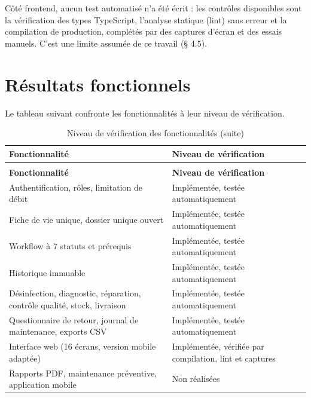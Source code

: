 Côté frontend, aucun test automatisé n'a été écrit : les contrôles disponibles sont la vérification des types TypeScript, l'analyse statique (lint) sans erreur et la compilation de production, complétés par des captures d'écran et des essais manuels. C'est une limite assumée de ce travail (§ 4.5).

\section{Résultats fonctionnels}

Le tableau suivant confronte les fonctionnalités à leur niveau de vérification.


{\small{}\renewcommand{\arraystretch}{1.3}
\begin{longtable}{|>{\raggedright\arraybackslash}p{8.22cm}|>{\raggedright\arraybackslash}p{6.39cm}|}
\caption{Niveau de vérification des fonctionnalités}\\
\hline
\rowcolor{ALbleu} \sffamily\bfseries\color{white} Fonctionnalité & \sffamily\bfseries\color{white} Niveau de vérification \\ \hline
\endfirsthead
\caption[]{Niveau de vérification des fonctionnalités (suite)}\\
\hline
\rowcolor{ALbleu} \sffamily\bfseries\color{white} Fonctionnalité & \sffamily\bfseries\color{white} Niveau de vérification \\ \hline
\endhead
Authentification, rôles, limitation de débit & Implémentée, testée automatiquement \\ \hline
\rowcolor{ALgris} Fiche de vie unique, dossier unique ouvert & Implémentée, testée automatiquement \\ \hline
Workflow à 7 statuts et prérequis & Implémentée, testée automatiquement \\ \hline
\rowcolor{ALgris} Historique immuable & Implémentée, testée automatiquement \\ \hline
Désinfection, diagnostic, réparation, contrôle qualité, stock, livraison & Implémentée, testée automatiquement \\ \hline
\rowcolor{ALgris} Questionnaire de retour, journal de maintenance, exports CSV & Implémentée, testée automatiquement \\ \hline
Interface web (16 écrans, version mobile adaptée) & Implémentée, vérifiée par compilation, lint et captures \\ \hline
\rowcolor{ALgris} Rapports PDF, maintenance préventive, application mobile & Non réalisées \\ \hline
\end{longtable}
}

